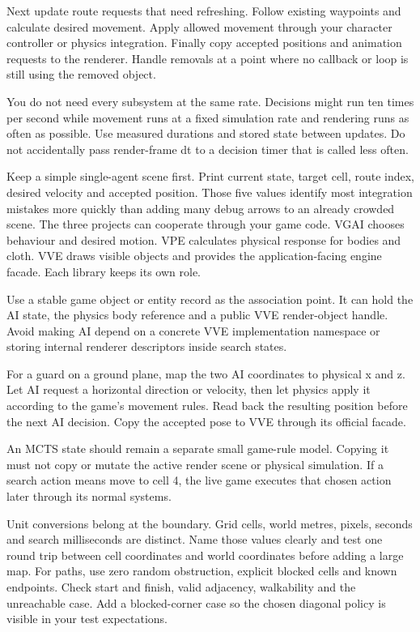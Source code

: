\documentclass[11pt,a4paper]{article}
\begin{document}
Next update route requests that need refreshing. Follow existing waypoints and calculate desired movement. Apply allowed movement through your character controller or physics integration. Finally copy accepted positions and animation requests to the renderer. Handle removals at a point where no callback or loop is still using the removed object.

You do not need every subsystem at the same rate. Decisions might run ten times per second while movement runs at a fixed simulation rate and rendering runs as often as possible. Use measured durations and stored state between updates. Do not accidentally pass render-frame dt to a decision timer that is called less often.

Keep a simple single-agent scene first. Print current state, target cell, route index, desired velocity and accepted position. Those five values identify most integration mistakes more quickly than adding many debug arrows to an already crowded scene.
The three projects can cooperate through your game code. VGAI chooses behaviour and desired motion. VPE calculates physical response for bodies and cloth. VVE draws visible objects and provides the application-facing engine facade. Each library keeps its own role.

Use a stable game object or entity record as the association point. It can hold the AI state, the physics body reference and a public VVE render-object handle. Avoid making AI depend on a concrete VVE implementation namespace or storing internal renderer descriptors inside search states.

For a guard on a ground plane, map the two AI coordinates to physical x and z. Let AI request a horizontal direction or velocity, then let physics apply it according to the game's movement rules. Read back the resulting position before the next AI decision. Copy the accepted pose to VVE through its official facade.

An MCTS state should remain a separate small game-rule model. Copying it must not copy or mutate the active render scene or physical simulation. If a search action means move to cell 4, the live game executes that chosen action later through its normal systems.

Unit conversions belong at the boundary. Grid cells, world metres, pixels, seconds and search milliseconds are distinct. Name those values clearly and test one round trip between cell coordinates and world coordinates before adding a large map.
For paths, use zero random obstruction, explicit blocked cells and known endpoints. Check start and finish, valid adjacency, walkability and the unreachable case. Add a blocked-corner case so the chosen diagonal policy is visible in your test expectations.
\end{document}
